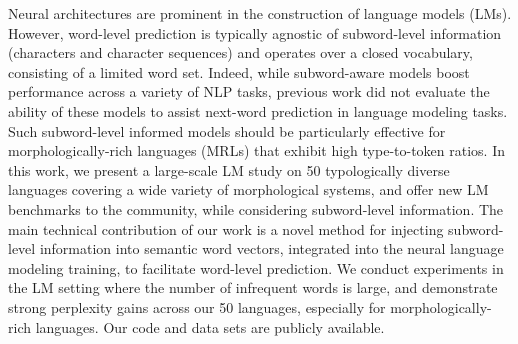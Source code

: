 Neural architectures are prominent in the construction of language models (LMs). However, word-level prediction is typically agnostic of subword-level information (characters and character sequences) and operates over a closed vocabulary, consisting of a limited word set. Indeed, while subword-aware models boost performance across a variety of NLP tasks, previous work did not evaluate the ability of these models to assist next-word prediction in language modeling tasks. Such subword-level informed models should be particularly effective for morphologically-rich languages (MRLs) that exhibit high type-to-token ratios. In this work, we present a large-scale LM study on 50 typologically diverse languages covering a wide variety of morphological systems, and offer new LM benchmarks to the community, while considering subword-level information. The main technical contribution of our work is a novel method for injecting subword-level information into semantic word vectors, integrated into the neural language modeling training, to facilitate word-level prediction. We conduct experiments in the LM setting where the number of infrequent words is large, and demonstrate strong perplexity gains across our 50 languages, especially for morphologically-rich languages. Our code and data sets are publicly available.
